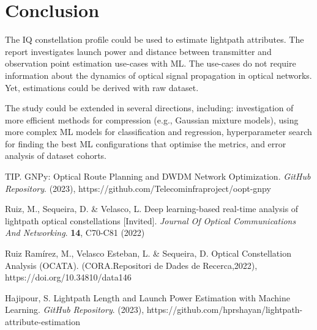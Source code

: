 \documentclass[lettersize,journal, one-column]{IEEEtran}
\begin{document}
\section{Conclusion}
\label{section:conclusion}
The IQ constellation profile could be used to estimate lightpath attributes.
The report investigates launch power and distance between transmitter and observation point estimation use-cases with ML.
The use-cases do not require information about the dynamics of optical signal propagation in optical networks.
Yet, estimations could be derived with raw dataset. 

The study could be extended in several directions, including: investigation of more efficient methods for compression (e.g., Gaussian mixture models), using more complex ML models for classification and regression, hyperparameter search for finding the best ML configurations that optimise the metrics, and error analysis of dataset cohorts.


\begin{thebibliography}{1}


TIP. GNPy: Optical Route Planning and DWDM Network Optimization. {\em GitHub Repository}. (2023), https://github.com/Telecominfraproject/oopt-gnpy

Ruiz, M., Sequeira, D. \& Velasco, L. Deep learning-based real-time analysis of lightpath optical constellations [Invited]. {\em Journal Of Optical Communications And Networking}. \textbf{14}, C70-C81 (2022)

Ruiz Ramírez, M., Velasco Esteban, L. \& Sequeira, D. Optical Constellation Analysis (OCATA). (CORA.Repositori de Dades de Recerca,2022), https://doi.org/10.34810/data146

Hajipour, S. Lightpath Length and Launch Power Estimation with Machine Learning. {\em GitHub Repository}. (2023), https://github.com/hprshayan/lightpath-attribute-estimation




\end{thebibliography}
\end{document}
